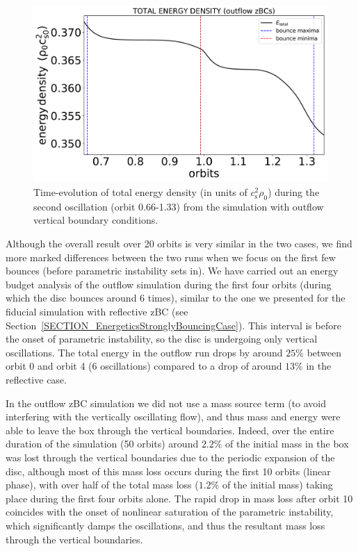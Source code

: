 \documentclass[fleqn,usenatbib]{mnras}
\begin{document}
\begin{figure}
\centering
\includegraphics[scale=0.3]{Figures/figure00PRODUCTION_VSTRHYDRORes32Re4687H6BouncezBCOutflowHigherCadenceOrb0toOrb4_totalenergydensity_2ndbounce}
\caption{Time-evolution of total energy density (in units of $c_\text{s}^2 \rho_0$) during the second oscillation (orbit 0.66-1.33) from the simulation with outflow vertical boundary conditions.}
\label{FIGURE_FiducialFreeBounceEnergiesFirstFewBoucnesOUTFLOW}
\end{figure}

Although the overall result over 20 orbits is very similar in the two cases, we find more marked differences between the two runs when we focus on the first few bounces (before parametric instability sets in). We have carried out an energy budget analysis of the outflow simulation during the first four orbits (during which the disc bounces around 6 times), similar to the one we presented for the fiducial simulation with reflective zBC (see Section~\ref{SECTION_EnergeticsStronglyBouncingCase}). This interval is before the onset of parametric instability, so the disc is undergoing only vertical oscillations. The total energy in the outflow run drops by around $25\%$ between orbit 0 and orbit 4 (6 oscillations) compared to a drop of around $13\%$ in the reflective case.

In the outflow zBC simulation we did not use a mass source term (to avoid interfering with the vertically oscillating flow), and thus mass and energy were able to leave the box through the vertical boundaries. Indeed, over the entire duration of the simulation (50 orbits) around $2.2\%$ of the initial mass in the box was lost through the vertical boundaries due to the periodic expansion of the disc, although most of this mass loss occurs during the first 10 orbits (linear phase), with over half of the total mass loss ($1.2\%$ of the initial mass) taking place during the first four orbits alone. The rapid drop in mass loss after orbit 10 coincides with the onset of nonlinear saturation of the parametric instability, which significantly damps the oscillations, and thus the resultant mass loss through the vertical boundaries.
\end{document}
